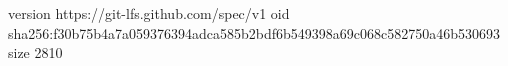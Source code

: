 version https://git-lfs.github.com/spec/v1
oid sha256:f30b75b4a7a059376394adca585b2bdf6b549398a69c068c582750a46b530693
size 2810
